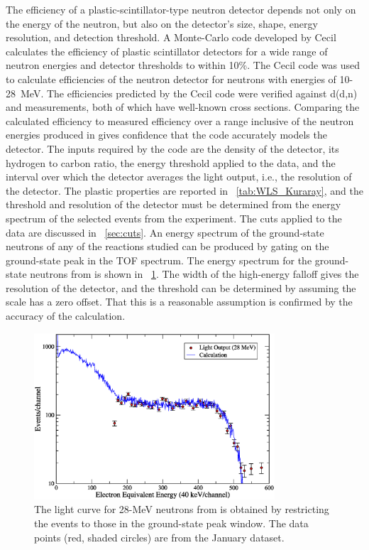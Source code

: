 The efficiency of a plastic-scintillator-type neutron detector depends not only on the energy of the neutron, but also on the detector's size, shape, energy resolution, and detection threshold.  A Monte-Carlo code developed by Cecil \citep{Cecil_neutEfficiency} calculates the efficiency of plastic scintillator detectors for a wide range of neutron energies and detector thresholds to within 10\%.  The Cecil code was used to calculate efficiencies of the neutron detector for neutrons with energies of 10-28~MeV.  The efficiencies predicted by the Cecil code were verified against d(d,n) and \MgReaction measurements, both of which have well-known cross sections.  Comparing the calculated efficiency to measured efficiency over a range inclusive of the neutron energies produced in \reaction gives confidence that the code accurately models the detector.   The inputs required by the code are the density of the detector, its hydrogen to carbon ratio, the energy threshold applied to the data, and the interval over which the detector averages the light output, i.e., the resolution of the detector.  The plastic properties are reported in {\tab}~\ref{tab:WLS_Kuraray}, and the threshold and resolution of the detector must be determined from the energy spectrum of the selected events from the experiment.  The cuts applied to the data are discussed in {\sect}~\ref{sec:cuts}.  An energy spectrum of the ground-state neutrons of any of the reactions studied can be produced by gating on the ground-state peak in the TOF spectrum.  The energy spectrum for the ground-state neutrons from \MgReaction is shown in {\fig}~\ref{fig:lowEnergyCut}.  The width of the high-energy falloff gives the resolution of the detector, and the threshold can be determined by assuming the scale has a zero offset.  That this is a reasonable assumption is confirmed by the accuracy of the calculation. 
\begin{figure}[!htbp]
\centering
\includegraphics[width=0.8\textwidth]{figures/Lite_28MeV.eps}
\caption[Total light deposited 28-MeV neutrons.]{The light curve for 28-MeV neutrons from \MgReaction is obtained by restricting the events to those in the ground-state peak window.  The data points (red, shaded circles) are from the January dataset.}
\label{fig:lowEnergyCut}
\end{figure}
  
